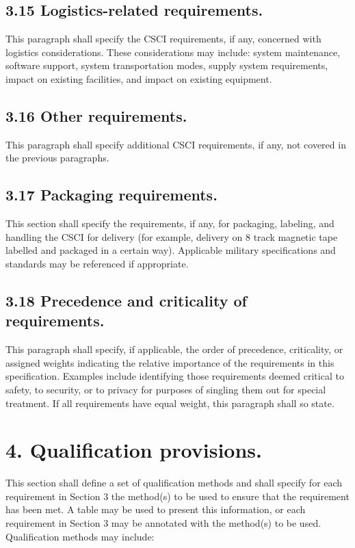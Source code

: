 \subsection{3.15 Logistics-related requirements.}

This paragraph shall specify the CSCI requirements, if any, concerned
with logistics considerations. These considerations may include: system
maintenance, software support, system transportation modes, supply
system requirements, impact on existing facilities, and impact on
existing equipment.

\subsection{3.16 Other requirements.}

This paragraph shall specify additional CSCI requirements, if any, not
covered in the previous paragraphs.

\subsection{3.17 Packaging requirements.}

This section shall specify the requirements, if any, for packaging,
labeling, and handling the CSCI for delivery (for example, delivery on 8
track magnetic tape labelled and packaged in a certain way). Applicable
military specifications and standards may be referenced if appropriate.

\subsection{3.18 Precedence and criticality of requirements.}

This paragraph shall specify, if applicable, the order of precedence,
criticality, or assigned weights indicating the relative importance of
the requirements in this specification. Examples include identifying
those requirements deemed critical to safety, to security, or to privacy
for purposes of singling them out for special treatment. If all
requirements have equal weight, this paragraph shall so state.

\section{4. Qualification provisions.}

This section shall define a set of qualification methods and shall
specify for each requirement in Section 3 the method(s) to be used to
ensure that the requirement has been met. A table may be used to present
this information, or each requirement in Section 3 may be annotated with
the method(s) to be used. Qualification methods may include:

